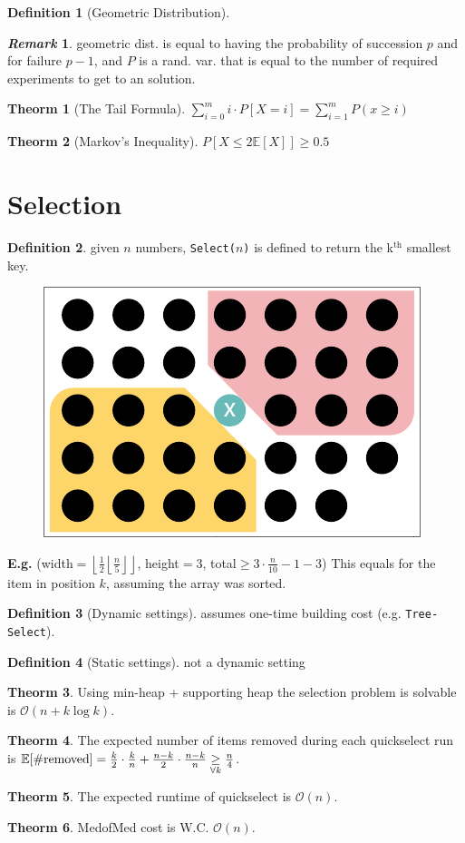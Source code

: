 \documentclass[]{article}
\newcommand\compactsection   [1]        {\vspace{-10pt}\section{#1}\vspace{-6pt}}
\theoremstyle{definition}
\newtheorem{Theorem}{\color{theoColor}Theorm}
\newtheorem{Definition}{\color{defiColor}Definition}
\newtheorem{Remark}{\textit{Remark}}
\newcommand\theo  [1] {\begin{Theorem}#1\end{Theorem}}
\newcommand\defi  [1] {\begin{Definition}#1\end{Definition}}
\newcommand\E     {\mathbb{E}}
\newcommand\oc    {\mathcal{O}}
\newcommand\rf    {\right\rfloor}
\newcommand\lf    {\left\lfloor}
\newcommand\floor [1] {\lf #1 \rf}
\begin{document}
\begin{multicols}{4}
\begin{Definition}[Geometric Distribution]
			\end{Definition}
			\begin{Remark}
				geometric dist. is equal to having the probability of succession $p$ and for failure $p - 1$, and $P$ is a rand. var. that is equal to the number of required experiments to get to an solution. 
			\end{Remark}
			\begin{Theorem}[The Tail Formula]\!\!\!
				\hfil $\sum_{i = 0}^{m}i \cdot P[X \!=\! i] = \sum_{i = 1}^{m} \!P(x \ge i)$
			\end{Theorem}
			\begin{Theorem}[Markov's Inequality]
				\hfil $P[X \le 2\E[X]] \ge 0.5$
			\end{Theorem}
		
		\compactsection{Selection}
			\defi{given $n$ numbers, \texttt{Select($n$)} is defined to return the k$^{\text{th}}$ smallest key. }
			\begin{figure}
				\includegraphics[width=\linewidth]{images/MedofMed}
				\vspace{-10pt}
			\end{figure}
			\textbf{E.g.} (width$=\floor{\frac{1}{2}\floor{\frac{n}{5}}}$, height$=3$, total$\ge3 \cdot \frac{n}{10} - 1 - 3$)
			This equals for the item in position $k$, assuming the array was sorted. 
			\begin{Definition}[Dynamic settings]
					assumes one-time building cost (e.g. \texttt{Tree-Select}). 
			\end{Definition}
			\begin{Definition}[Static settings]
				not a dynamic setting
			\end{Definition}
			\theo{Using min-heap + supporting heap the selection problem is solvable is $\oc(n + k \log k)$. }
			\theo{The expected number of items removed during each quickselect run is $\E[\#\text{\rm removed}] = \frac{k}{2}\cdot\frac{k}{n} + \frac{n - k}{2}\cdot\frac{n - k}{n} \underset{\forall k}{\ge} \frac{n}{4}$. }
			\theo{The expected runtime of quickselect is $\oc(n)$. }
			\theo{MedofMed cost is W.C. $\oc(n)$. }
			

\end{multicols}
\end{document}
